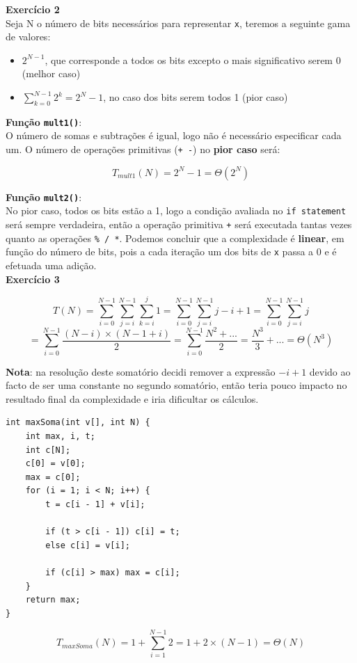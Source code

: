 \documentclass[a4paper,11pt]{article}
\begin{document}
	\newpage
	
	\noindent \textbf{Exercício 2}\\
	
	\noindent Seja N o número de bits necessários para representar \texttt{x}, teremos a seguinte gama de valores:
	\begin{itemize}
		\item $ 2^{N-1} $, que corresponde a todos os bits excepto o mais significativo serem 0 (melhor caso)
		\item $ \sum_{k=0}^{N-1} 2^k = 2^N - 1 $, no caso dos bits serem todos 1 (pior caso)
	\end{itemize}
	
	\noindent \textbf{Função \texttt{mult1()}}:\\
	
	\noindent O número de somas e subtrações é igual, logo não é necessário especificar cada um. O número de operações primitivas (\texttt{+ -}) no \textbf{pior caso} será:
	
	\[ T_{mult1}(N) = 2^N - 1 = \Theta(2^N) \]
	
	\noindent \textbf{Função \texttt{mult2()}}:\\
	
	\noindent No pior caso, todos os bits estão a 1, logo a condição avaliada no \texttt{if statement} será sempre verdadeira, então a operação primitiva \texttt{+} será executada tantas vezes quanto as operações \texttt{\% / *}. Podemos concluir que a complexidade é \textbf{linear}, em função do número de bits, pois a cada iteração um dos bits de \texttt{x} passa a 0 e é efetuada uma adição.\\
	
	
	\noindent \textbf{Exercício 3}
	
	\[
		T(N) = \sum_{i=0}^{N-1} \sum_{j=i}^{N-1} \sum_{k=i}^{j} 1 = \sum_{i=0}^{N-1} \sum_{j=i}^{N-1} j-i+1 = \sum_{i=0}^{N-1} \sum_{j=i}^{N-1} j	
	\]
	\[
		= \sum_{i=0}^{N-1} \frac{(N-i) \times (N-1+i)}{2} = \sum_{i=0}^{N-1} \frac{N^2 + ...}{2} = \frac{N^3}{3} + ... = \Theta(N^3)
	\]
	
	\noindent \textbf{Nota}: na resolução deste somatório decidi remover a expressão $ -i + 1 $ devido ao facto de ser uma constante no segundo somatório, então teria pouco impacto no resultado final da complexidade e iria dificultar os cálculos.
	
\begin{Verbatim}[tabsize=4]
int maxSoma(int v[], int N) {
	int max, i, t;
	int c[N];
	c[0] = v[0];
	max = c[0];
	for (i = 1; i < N; i++) {
		t = c[i - 1] + v[i];
				
		if (t > c[i - 1]) c[i] = t;
		else c[i] = v[i];
				
		if (c[i] > max) max = c[i];
	}
	return max;
}
	\end{Verbatim}
	\[
	T_{maxSoma}(N) = 1 + \sum_{i=1}^{N-1} 2 = 1 + 2 \times (N-1) = \Theta(N)
	\]
	
\end{document}
